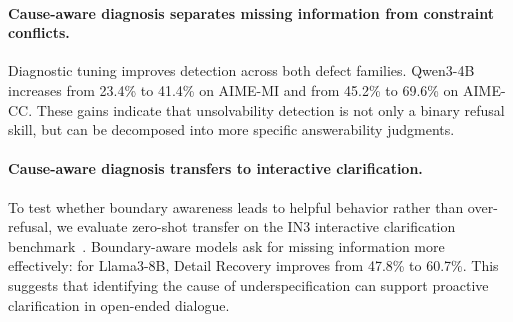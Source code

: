 \paragraph{Cause-aware diagnosis separates missing information from constraint conflicts.} Diagnostic tuning improves detection across both defect families. Qwen3-4B increases from 23.4\% to 41.4\% on AIME-MI and from 45.2\% to 69.6\% on AIME-CC. These gains indicate that unsolvability detection is not only a binary refusal skill, but can be decomposed into more specific answerability judgments.

\paragraph{Cause-aware diagnosis transfers to interactive clarification.} To test whether boundary awareness leads to helpful behavior rather than over-refusal, we evaluate zero-shot transfer on the IN3 interactive clarification benchmark~\citep{qian-etal-2024-tell}. Boundary-aware models ask for missing information more effectively: for Llama3-8B, Detail Recovery improves from 47.8\% to 60.7\%. This suggests that identifying the cause of underspecification can support proactive clarification in open-ended dialogue.



